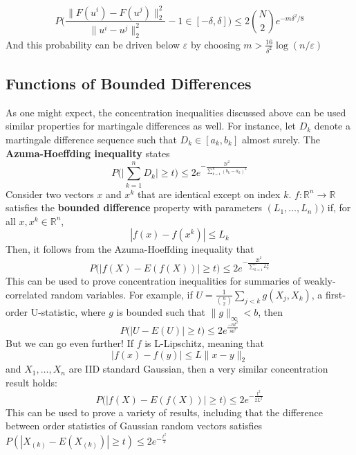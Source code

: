 \documentclass[
]{article}
\begin{document}
\[P\Big(\frac{\lVert F(u^i) - F(u^j) \rVert_2^2}{\lVert u^i - u^j \rVert_2^2} -1 \in [-\delta, \delta]\Big) \leq 2 {N\choose 2} e^{-m\delta^2 / 8}\]
And this probability can be driven below \(\varepsilon\) by choosing
\(m > \frac{16}{\delta^2} \log (n / \varepsilon)\)

\hypertarget{functions-of-bounded-differences}{%
\subsection{Functions of Bounded
Differences}\label{functions-of-bounded-differences}}

As one might expect, the concentration inequalities discussed above can
be used similar properties for martingale differences as well. For
instance, let \(D_k\) denote a martingale difference sequence such that
\(D_k \in [a_k, b_k]\) almost surely. The \textbf{Azuma-Hoeffding
inequality} states
\[P\Big( \Big | \sum_{k=1}^n D_k \Big| \geq t \Big) \leq 2e^{-\frac{2t^2}{\sum_{k=1}^n (b_k - a_k)^2}}\]
Consider two vectors \(x\) and \(x^k\) that are identical except on
index \(k\). \(f : \mathbb{R}^n \rightarrow \mathbb{R}\) satisfies the
\textbf{bounded difference} property with parameters
\((L_1, \ldots, L_n))\) if, for all \(x, x^k \in \mathbb{R}^n\),
\[| f(x) - f(x^k) | \leq L_k\] Then, it follows from the Azuma-Hoeffding
inequality that
\[P\Big( \Big | f(X) - E(f(X)) \Big| \geq t \Big) \leq 2e^{-\frac{2t^2}{\sum_{k=1}^n L_k^2}}\]
This can be used to prove concentration inequalities for summaries of
weakly-correlated random variables. For example, if
\(U = \frac{1}{n \choose 2} \sum_{j < k} g(X_j, X_k)\), a first-order
U-statistic, where \(g\) is bounded such that
\(\lVert g \rVert_\infty < b\), then
\[P\Big(|U - E(U)| \geq t\Big) \leq 2e^\frac{-nt^2}{8b^2}\] But we can
go even further! If \(f\) is L-Lipschitz, meaning that
\[|f(x) - f(y) | \leq L \lVert x - y \rVert_2\] and \(X_1, \ldots, X_n\)
are IID standard Gaussian, then a very similar concentration result
holds:
\[P\Big( \Big | f(X) - E(f(X)) \Big| \geq t \Big) \leq 2e^{-\frac{t^2}{2L^2}}\]
This can be used to prove a variety of results, including that the
difference between order statistics of Gaussian random vectors satisfies
\(P(|X_{(k)} - E(X_{(k)})| \geq t) \leq 2e^{-\frac{t^2}{2}}\)
\end{document}
